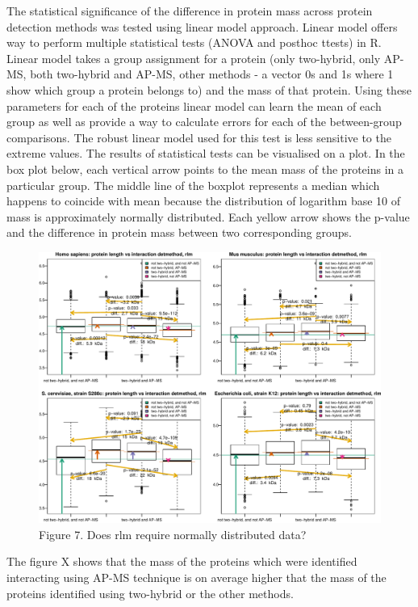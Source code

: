 \documentclass[]{article}
\begin{document}
The statistical significance of the difference in protein mass across
protein detection methods was tested using linear model approach. Linear
model offers way to perform multiple statistical tests (ANOVA and
posthoc ttests) in R. Linear model takes a group assignment for a
protein (only two-hybrid, only AP-MS, both two-hybrid and AP-MS, other
methods - a vector 0s and 1s where 1 show which group a protein belongs
to) and the mass of that protein. Using these parameters for each of the
proteins linear model can learn the mean of each group as well as
provide a way to calculate errors for each of the between-group
comparisons. The robust linear model used for this test is less
sensitive to the extreme values. The results of statistical tests can be
visualised on a plot. In the box plot below, each vertical arrow points
to the mean mass of the proteins in a particular group. The middle line
of the boxplot represents a median which happens to coincide with mean
because the distribution of logarithm base 10 of mass is approximately
normally distributed. Each yellow arrow shows the p-value and the
difference in protein mass between two corresponding groups.

\begin{figure}[htbp]
\centering
\includegraphics{final_report_files/figure-latex/protein_length_det_method_rlm-1.pdf}
\caption{Figure 7. Does rlm require normally distributed data?}
\end{figure}

The figure X shows that the mass of the proteins which were identified
interacting using AP-MS technique is on average higher that the mass of
the proteins identified using two-hybrid or the other methods.
\end{document}
